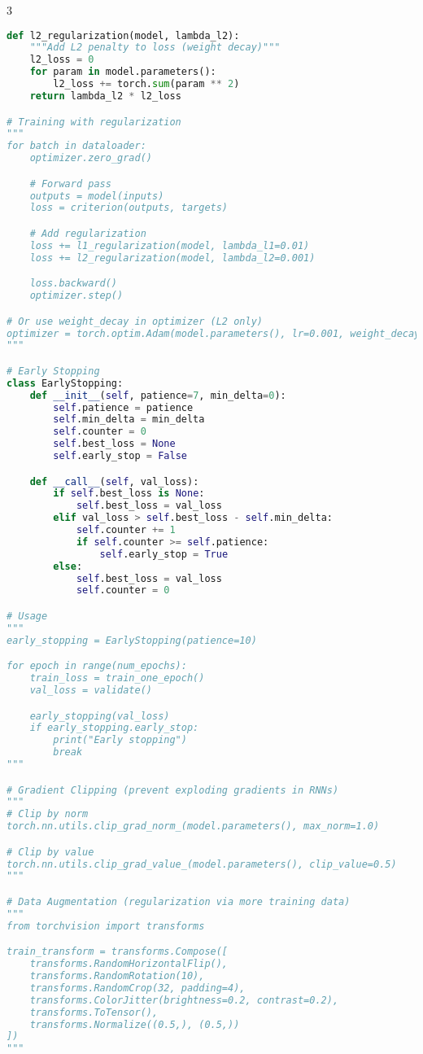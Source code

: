 \documentclass[8pt,landscape]{article}
\begin{document}
\begin{multicols}{3}
\begin{lstlisting}[language=Python]
def l2_regularization(model, lambda_l2):
    """Add L2 penalty to loss (weight decay)"""
    l2_loss = 0
    for param in model.parameters():
        l2_loss += torch.sum(param ** 2)
    return lambda_l2 * l2_loss

# Training with regularization
"""
for batch in dataloader:
    optimizer.zero_grad()

    # Forward pass
    outputs = model(inputs)
    loss = criterion(outputs, targets)

    # Add regularization
    loss += l1_regularization(model, lambda_l1=0.01)
    loss += l2_regularization(model, lambda_l2=0.001)

    loss.backward()
    optimizer.step()

# Or use weight_decay in optimizer (L2 only)
optimizer = torch.optim.Adam(model.parameters(), lr=0.001, weight_decay=0.01)
"""

# Early Stopping
class EarlyStopping:
    def __init__(self, patience=7, min_delta=0):
        self.patience = patience
        self.min_delta = min_delta
        self.counter = 0
        self.best_loss = None
        self.early_stop = False

    def __call__(self, val_loss):
        if self.best_loss is None:
            self.best_loss = val_loss
        elif val_loss > self.best_loss - self.min_delta:
            self.counter += 1
            if self.counter >= self.patience:
                self.early_stop = True
        else:
            self.best_loss = val_loss
            self.counter = 0

# Usage
"""
early_stopping = EarlyStopping(patience=10)

for epoch in range(num_epochs):
    train_loss = train_one_epoch()
    val_loss = validate()

    early_stopping(val_loss)
    if early_stopping.early_stop:
        print("Early stopping")
        break
"""

# Gradient Clipping (prevent exploding gradients in RNNs)
"""
# Clip by norm
torch.nn.utils.clip_grad_norm_(model.parameters(), max_norm=1.0)

# Clip by value
torch.nn.utils.clip_grad_value_(model.parameters(), clip_value=0.5)
"""

# Data Augmentation (regularization via more training data)
"""
from torchvision import transforms

train_transform = transforms.Compose([
    transforms.RandomHorizontalFlip(),
    transforms.RandomRotation(10),
    transforms.RandomCrop(32, padding=4),
    transforms.ColorJitter(brightness=0.2, contrast=0.2),
    transforms.ToTensor(),
    transforms.Normalize((0.5,), (0.5,))
])
"""
\end{lstlisting}


\end{multicols}
\end{document}
